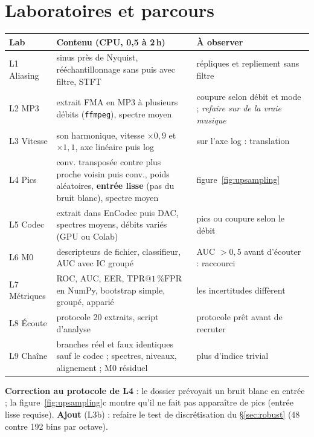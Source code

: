 \documentclass[10pt,a4paper]{article}
\makeatletter
\newcommand{\tprfpr}{\mathrm{TPR}@1\,\%\mathrm{FPR}}
\makeatother
\begin{document}
\section{Laboratoires et parcours}\label{app:labs}
\footnotesize
\begin{center}
\begin{tabularx}{\textwidth}{@{}L{1.9cm}XL{3.3cm}@{}}
\toprule
\textbf{Lab} & \textbf{Contenu (CPU, 0,5 à 2\,h)} & \textbf{À observer}\\
\midrule
L1 Aliasing & sinus près de Nyquist, rééchantillonnage sans puis avec filtre, STFT & répliques et repliement sans filtre\\
L2 MP3 & extrait FMA en MP3 à plusieurs débits (\texttt{ffmpeg}), spectre moyen & coupure selon débit et mode ; \emph{refaire sur de la vraie musique}\\
L3 Vitesse & son harmonique, vitesse $\times0{,}9$ et $\times1{,}1$, axe linéaire puis log & sur l'axe log : translation\\
L4 Pics & conv. transposée contre plus proche voisin puis conv., poids aléatoires, \textbf{entrée lisse} (pas du bruit blanc), spectre moyen & figure~\ref{fig:upsampling}\\
L5 Codec & extrait dans EnCodec puis DAC, spectres moyens, débits variés (GPU ou Colab) & pics ou coupure selon le débit\\
L6 M0 & descripteurs de fichier, classifieur, AUC avec IC groupé & AUC $>0{,}5$ avant d'écouter : raccourci\\
L7 Métriques & ROC, AUC, EER, $\tprfpr$ en NumPy, bootstrap simple, groupé, apparié & les incertitudes diffèrent\\
L8 Écoute & protocole 20 extraits, script d'analyse & protocole prêt avant de recruter\\
L9 Chaîne & branches réel et faux identiques sauf le codec ; spectres, niveaux, alignement ; M0 résiduel & plus d'indice trivial\\
\bottomrule
\end{tabularx}
\end{center}
\textbf{Correction au protocole de L4} : le dossier prévoyait un bruit blanc en entrée ; la figure~\ref{fig:upsampling}c montre qu'il ne fait pas apparaître de pics (entrée lisse requise). \textbf{Ajout} (L3b) : refaire le test de discrétisation du §\ref{sec:robust} (48 contre 192 bins par octave).
\end{document}
